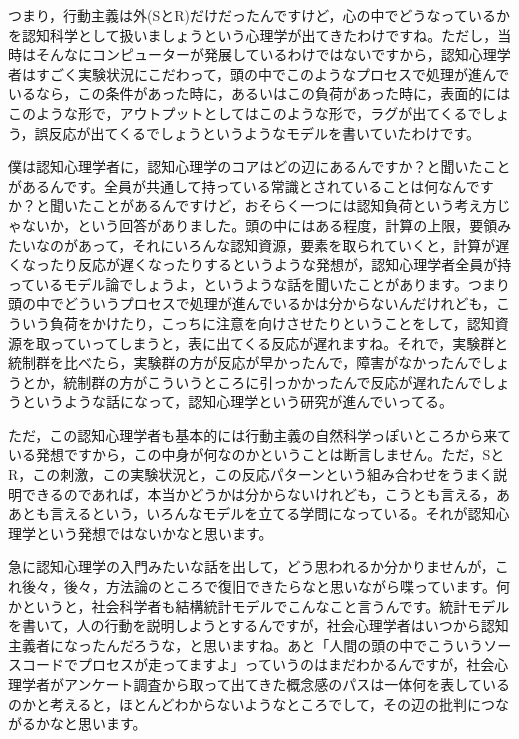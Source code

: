 \documentclass{ltjsbook}
\begin{document}
つまり，行動主義は外(SとR)だけだったんですけど，心の中でどうなっているかを認知科学として扱いましょうという心理学が出てきたわけですね。ただし，当時はそんなにコンピューターが発展しているわけではないですから，認知心理学者はすごく実験状況にこだわって，頭の中でこのようなプロセスで処理が進んでいるなら，この条件があった時に，あるいはこの負荷があった時に，表面的にはこのような形で，アウトプットとしてはこのような形で，ラグが出てくるでしょう，誤反応が出てくるでしょうというようなモデルを書いていたわけです。

僕は認知心理学者に，認知心理学のコアはどの辺にあるんですか？と聞いたことがあるんです。全員が共通して持っている常識とされていることは何なんですか？と聞いたことがあるんですけど，おそらく一つには認知負荷という考え方じゃないか，という回答がありました。頭の中にはある程度，計算の上限，要領みたいなのがあって，それにいろんな認知資源，要素を取られていくと，計算が遅くなったり反応が遅くなったりするというような発想が，認知心理学者全員が持っているモデル論でしょうよ，というような話を聞いたことがあります。つまり頭の中でどういうプロセスで処理が進んでいるかは分からないんだけれども，こういう負荷をかけたり，こっちに注意を向けさせたりということをして，認知資源を取っていってしまうと，表に出てくる反応が遅れますね。それで，実験群と統制群を比べたら，実験群の方が反応が早かったんで，障害がなかったんでしょうとか，統制群の方がこういうところに引っかかったんで反応が遅れたんでしょうというような話になって，認知心理学という研究が進んでいってる。

ただ，この認知心理学者も基本的には行動主義の自然科学っぽいところから来ている発想ですから，この中身が何なのかということは断言しません。ただ，SとR，この刺激，この実験状況と，この反応パターンという組み合わせをうまく説明できるのであれば，本当かどうかは分からないけれども，こうとも言える，ああとも言えるという，いろんなモデルを立てる学問になっている。それが認知心理学という発想ではないかなと思います。

急に認知心理学の入門みたいな話を出して，どう思われるか分かりませんが，これ後々，後々，方法論のところで復旧できたらなと思いながら喋っています。何かというと，社会科学者も結構統計モデルでこんなこと言うんです。統計モデルを書いて，人の行動を説明しようとするんですが，社会心理学者はいつから認知主義者になったんだろうな，と思いますね。あと「人間の頭の中でこういうソースコードでプロセスが走ってますよ」っていうのはまだわかるんですが，社会心理学者がアンケート調査から取って出てきた概念感のパスは一体何を表しているのかと考えると，ほとんどわからないようなところでして，その辺の批判につながるかなと思います。
\end{document}
